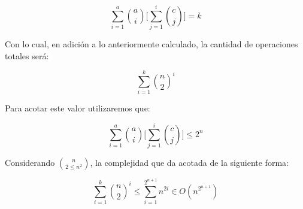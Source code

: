 \[
\sum_{i=1}^{a}\binom{a}{i}\bigg[\sum_{j=1}^{i}\binom{c}{j}\bigg]=k
\]  

Con lo cual, en adición a lo anteriormente calculado, la cantidad de operaciones totales será:

 \[
 \sum_{i=1}^{k}\binom{n}{2}^i
 \]

Para acotar este valor utilizaremos que:

\[
\sum_{i=1}^{a}\binom{a}{i}\bigg[\sum_{j=1}^{i}\binom{c}{j}\bigg]\leq 2^{n}
\]

Considerando $\binom{n}{2 \leq n^2}$, la complejidad que da acotada de la siguiente forma:

 \[
 \sum_{i=1}^{k}\binom{n}{2}^i \leq \sum_{i=1}^{2^{n+1}}n^{2i} \in O(n^{2^{n+1}})
 \]



\newpage


